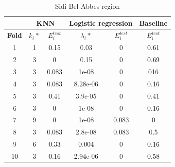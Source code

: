 \documentclass[10pt]{article}
\numberwithin{equation}{section}
\numberwithin{figure}{section}
\numberwithin{table}{section}
\begin{document}
\begin{table}[H]
\centering
\begin{tabular}{c|c|c|c|c|c|}
\cline{2-6}
\multicolumn{1}{l|}{\textbf{}}      & \multicolumn{2}{c|}{\textbf{KNN}}       & \multicolumn{2}{c|}{\textbf{Logistic regression}} & \textbf{Baseline}     \\ \hline
\multicolumn{1}{|c|}{\textbf{Fold}} & \textbf{$k_i*$} & \textbf{$E_i^{test}$} & \textbf{$\lambda_i*$}  & \textbf{$E_i^{test}$}  & \textbf{$E_i^{test}$} \\ \hline
\multicolumn{1}{|c|}{1}             & 1               & 0.15                  & 0.03                     & 0                & 0.61                  \\ \hline
\multicolumn{1}{|c|}{2}             & 3               & 0                   & 0.15                     & 0                   & 0.69                  \\ \hline
\multicolumn{1}{|c|}{3}             & 3               & 0.083                 & 1e-08                     & 0                     & 016                  \\ \hline
\multicolumn{1}{|c|}{4}             & 3               & 0.083                  & 8.28e-06                     & 0                     & 0.16                  \\ \hline
\multicolumn{1}{|c|}{5}             & 3               & 0.41                  & 3.9e-05                     & 0                   & 0.41                  \\ \hline
\multicolumn{1}{|c|}{6}             & 3               & 0                  &  1e-08                     & 0                   & 0.16                  \\ \hline
\multicolumn{1}{|c|}{7}             & 9             & 0                   & 1e-08                     & 0.083                   & 0                  \\ \hline
\multicolumn{1}{|c|}{8}             & 3               & 0.083                  & 2.8e-08                     & 0.083                   & 0.5                  \\ \hline
\multicolumn{1}{|c|}{9}             & 6               & 0.33                   & 0.004                     & 0                  & 0.16                  \\ \hline
\multicolumn{1}{|c|}{10}            & 3               & 0.16                  & 2.94e-06                     &   0                 & 0.58                  \\ \hline
\end{tabular}
\caption{Sidi-Bel-Abbes region}
\label{Table22}
\end{table}
\end{document}
